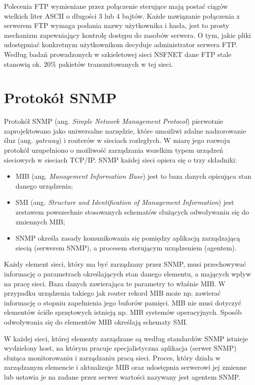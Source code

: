 Polecenia FTP wymieniane przez połączenie sterujące mają postać ciągów wielkich liter ASCII o długości 3 
lub 4 bajtów. Każde nawiązanie połączenia z serwerem FTP wymaga podania nazwy użytkownika i hasła, jest to 
prosty mechanizm zapewniający kontrolę dostępu do zasobów serwera. O tym, jakie pliki udostępniać konkretnym 
użytkownikom decyduje administrator serwera FTP.
Według badań prowadzonych w szkieletowej sieci NSFNET dane FTP stale stanowią ok. 20\% pakietów 
transmitowanych w tej sieci. 

\section{Protokół SNMP}

Protokół SNMP (ang. \emph{Simple Network Management Protocol}) pierwotnie zaprojektowano jako uniwersalne narzędzie, 
które umożliwi zdalne nadzorowanie śluz (ang. \emph{gateway})  i routerów w sieciach rozległych. W miarę jego rozwoju 
protokół uzupełniono o możliwość zarządzania wszelkim typem urządzeń sieciowych w sieciach TCP/IP. SNMP każdej 
sieci opiera się o trzy składniki:
\begin{itemize}
\item MIB (ang. \emph{Management Information Base}) jest to baza danych opisująca stan danego urządzenia;
\item SMI (ang. \emph{Structure and Identification of Management Information}) jest zestawem powszechnie stosowanych 
schematów służących odwoływaniu się do zmiennych MIB;
\item SNMP określa zasady komunikowania się pomiędzy aplikacją zarządzającą siecią (serwerem SNMP), a procesem 
sterującym urządzeniem (agentem).
\end{itemize}

Każdy element sieci, który ma być zarządzany przez SNMP, musi przechowywać informację o parametrach określających
stan danego elementu, a mających wpływ na pracę sieci. Baza danych zawierająca te parametry to właśnie MIB. W 
przypadku urządzenia takiego jak router rekord MIB może np. zawierać informację o stopniu zapełnienia jego 
buforów pamięci. MIB nie musi dotyczyć elementów ściśle sprzętowych istnieją np. MIB systemów operacyjnych. 
Sposób odwoływania się do elementów MIB określają schematy SMI.

W każdej sieci, której elementy zarządzane są według standardów SNMP istnieje wydzielony host, na którym 
pracuje specjalistyczna aplikacja (serwer SNMP) służąca monitorowaniu i zarządzaniu pracą sieci. Proces, który 
działa w zarządzanym elemencie i  aktualizuje MIB oraz udostępnia serwerowi jej zmienne lub ustawia je na zadane 
przez serwer wartości nazywany jest agentem SNMP.

